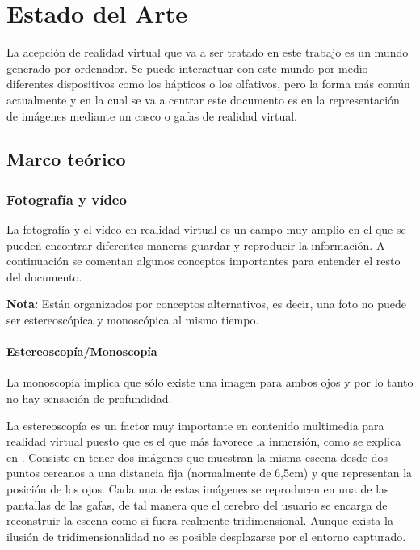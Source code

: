 
\pagestyle{empty}
\chapter {Estado del Arte}

La acepción de realidad virtual que va a ser tratado en este trabajo es un mundo generado por ordenador. Se puede interactuar con este mundo por medio diferentes dispositivos como los hápticos o los olfativos, pero la forma más común actualmente y en la cual se va a centrar este documento es en la representación de imágenes mediante un casco o gafas de realidad virtual.

\section{Marco teórico}

\subsection{Fotografía y vídeo}
La fotografía y el vídeo en realidad virtual es un campo muy amplio en el que se pueden encontrar diferentes maneras guardar y reproducir la información. A continuación se comentan algunos conceptos importantes para entender el resto del documento. 

\textbf{Nota:} Están organizados por conceptos alternativos, es decir, una foto no puede ser estereoscópica y monoscópica al mismo tiempo.

\subsubsection{Estereoscopía/Monoscopía}
La monoscopía implica que sólo existe una imagen para ambos ojos y por lo tanto no hay sensación de profundidad.

La estereoscopía es un factor muy importante en contenido multimedia para realidad virtual puesto que es el que más favorece la inmersión, como se explica en \cite{DiegoBezStereoscopy}. Consiste en tener dos imágenes que muestran la misma escena desde dos puntos cercanos a una distancia fija (normalmente de 6,5cm) y que representan la posición de los ojos. Cada una de estas imágenes se reproducen en una de las pantallas de las gafas, de tal manera que el cerebro del usuario se encarga de reconstruir la escena como si fuera realmente tridimensional. Aunque exista la ilusión de tridimensionalidad no es posible desplazarse por el entorno capturado.

